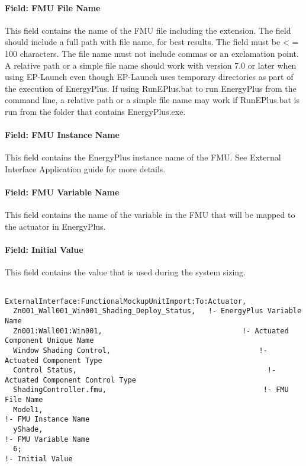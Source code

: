 \paragraph{Field: FMU File Name}\label{field-fmu-file-name-3}

This field contains the name of the FMU file including the extension. The field should include a full path with file name, for best results. The field must be \textless{} = 100 characters. The file name must not include commas or an exclamation point. A relative path or a simple file name should work with version 7.0 or later when using EP-Launch even though EP-Launch uses temporary directories as part of the execution of EnergyPlus. If using RunEPlus.bat to run EnergyPlus from the command line, a relative path or a simple file name may work if RunEPlus.bat is run from the folder that contains EnergyPlus.exe.

\paragraph{Field: FMU Instance Name}\label{field-fmu-instance-name-2}

This field contains the EnergyPlus instance name of the FMU. See External Interface Application guide for more details.

\paragraph{Field: FMU Variable Name}\label{field-fmu-variable-name-2}

This field contains the name of the variable in the FMU that will be mapped to the actuator in EnergyPlus.

\paragraph{Field: Initial Value}\label{field-initial-value-4}

This field contains the value that is used during the system sizing.

\begin{lstlisting}

ExternalInterface:FunctionalMockupUnitImport:To:Actuator,
  Zn001_Wall001_Win001_Shading_Deploy_Status,   !- EnergyPlus Variable Name
  Zn001:Wall001:Win001,                                 !- Actuated Component Unique Name
  Window Shading Control,                                   !- Actuated Component Type
  Control Status,                                             !- Actuated Component Control Type
  ShadingController.fmu,                                     !- FMU File Name
  Model1,                                                                   !- FMU Instance Name
  yShade,                                                                   !- FMU Variable Name
  6;                                                                             !- Initial Value
\end{lstlisting}

